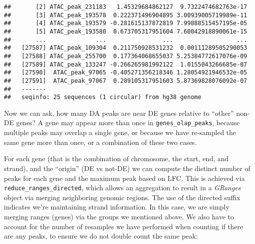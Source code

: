 \documentclass[
]{article}
\newenvironment{Shaded}{}{}
\newcommand{\DataTypeTok}[1]{\textcolor[rgb]{0.56,0.13,0.00}{#1}}
\newcommand{\KeywordTok}[1]{\textcolor[rgb]{0.00,0.44,0.13}{\textbf{#1}}}
\newcommand{\NormalTok}[1]{#1}
\newcommand{\OperatorTok}[1]{\textcolor[rgb]{0.40,0.40,0.40}{#1}}
\newcommand{\StringTok}[1]{\textcolor[rgb]{0.25,0.44,0.63}{#1}}
\begin{document}
\begin{verbatim}
##       [2] ATAC_peak_231183   1.45329684862127  9.7322474682763e-17
##       [3] ATAC_peak_193578  0.222371496904895 3.00939005719989e-11
##       [4] ATAC_peak_193579 -0.281615137872819 7.99888515457195e-05
##       [5] ATAC_peak_193580  0.673705317951604 7.60042918890061e-15
##       ...              ...                ...                  ...
##   [27587] ATAC_peak_109304  0.211750928531232  0.00111289505290053
##   [27588] ATAC_peak_255700  0.177364068655037 5.25384772617076e-09
##   [27589] ATAC_peak_133247 -0.266265981992122  1.0155043266685e-07
##   [27590]  ATAC_peak_97065 -0.405271356218346 1.28054921946532e-05
##   [27591]  ATAC_peak_97067  0.289105317951603 5.87369828076092e-07
##   -------
##   seqinfo: 25 sequences (1 circular) from hg38 genome
\end{verbatim}

Now we can ask, how many DA peaks are near DE genes relative to ``other'' non-DE
genes? A gene may appear more than once in \texttt{genes\_olap\_peaks}, because
multiple peaks may overlap a single gene, or because we have re-sampled the
same gene more than once, or a combination of these two cases.

For each gene (that is the combination of chromosome, the start, end, and
strand), and the ``origin'' (DE vs not-DE) we can compute the distinct number of
peaks for each gene and the maximum peak based on LFC. This is achieved via
\texttt{reduce\_ranges\_directed}, which allows an aggregation to result in a \emph{GRanges}
object via merging neighboring genomic regions. The use of the directed suffix
indicates we're maintaining strand information. In this case, we are simply
merging ranges (genes) via the groups we mentioned above. We also have to
account for the number of resamples we have performed when counting if there
are any peaks, to ensure we do not double count the same peak:

\begin{Shaded}
\end{Shaded}
\end{document}
